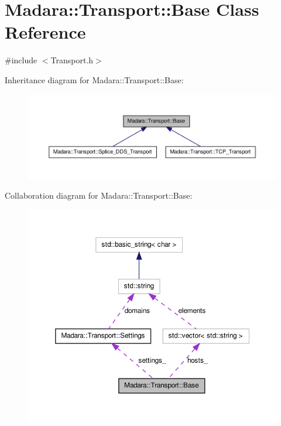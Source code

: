 \hypertarget{classMadara_1_1Transport_1_1Base}{
\section{Madara::Transport::Base Class Reference}
\label{dc/d97/classMadara_1_1Transport_1_1Base}
}


{\ttfamily \#include $<$Transport.h$>$}



Inheritance diagram for Madara::Transport::Base:
\nopagebreak
\begin{figure}[H]
\begin{center}
\leavevmode
\includegraphics[width=400pt]{d5/df7/classMadara_1_1Transport_1_1Base__inherit__graph}
\end{center}
\end{figure}


Collaboration diagram for Madara::Transport::Base:
\nopagebreak
\begin{figure}[H]
\begin{center}
\leavevmode
\includegraphics[width=360pt]{d3/de9/classMadara_1_1Transport_1_1Base__coll__graph}
\end{center}
\end{figure}
